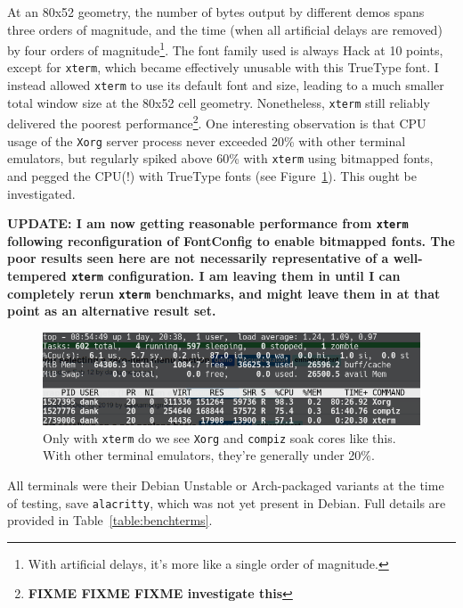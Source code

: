 At an 80x52 geometry,
the number of bytes output by different demos spans three orders of magnitude,
and the time (when all artificial delays are removed) by four orders of
magnitude\footnote{With artificial delays, it's more like a single order of
magnitude.}. The font family used is always Hack\cite{hacktypeface} at 10 points,
except for \texttt{xterm}, which became effectively unusable with this TrueType
font. I instead allowed \texttt{xterm} to use its default font and size, leading
to a much smaller total window size at the 80x52 cell geometry. Nonetheless,
\texttt{xterm} still reliably delivered the poorest performance\footnote{\textbf{FIXME FIXME FIXME investigate this}}.
One interesting observation is that CPU usage of the \texttt{Xorg} server process
never exceeded 20\% with other terminal emulators, but regularly spiked above 60\%
with \texttt{xterm} using bitmapped fonts, and pegged the CPU(!) with TrueType
fonts (see Figure~\ref{fig:badxterm}). This ought be investigated.

\textbf{UPDATE: I am now getting reasonable performance from \texttt{xterm}
  following reconfiguration of FontConfig to enable bitmapped fonts. The poor
  results seen here are not necessarily representative of a well-tempered
  \texttt{xterm} configuration. I am leaving them in until I can completely
  rerun \texttt{xterm} benchmarks, and might leave them in at that point as
  an alternative result set.}

\begin{figure}[!htb]
  \centering
\includegraphics[width=1\textwidth]{media/xterm-high-cpu.png}
\caption[Odd performance from \texttt{xterm}.]{Only with \texttt{xterm} do we see \texttt{Xorg} and \texttt{compiz}
  soak cores like this. With other terminal emulators, they're generally under
  20\%.}
\label{fig:badxterm}
\end{figure}

All terminals were their Debian Unstable or Arch-packaged variants at the time
of testing, save \texttt{alacritty}, which was not yet present in Debian. Full
details are provided in Table~\ref{table:benchterms}.


